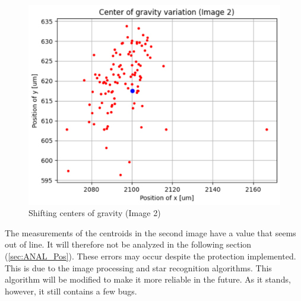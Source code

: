 \begin{figure}[H]
    \centering
    \includegraphics[scale=0.65]{assets/figures/MesuresResultats/VariationCenter2.png}
    \caption{Shifting centers of gravity (Image 2)}
    \label{fig:MES_VarCenter2}
\end{figure}
The measurements of the centroids in the second image have a value that seems out of line. It will therefore not be analyzed 
in the following section (\ref{sec:ANAL_Pos}). 
These errors may occur despite the protection implemented. 
This is due to the image processing and star recognition algorithms.
This algorithm will be modified to make it more reliable in the future. As it stands, however, it still contains a few bugs.